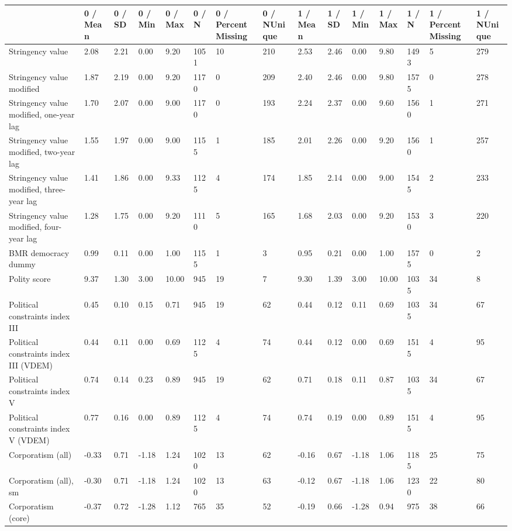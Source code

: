 
\begin{longtable}{lllllllllllllll}
\toprule
  & 0 / Mean & 0 / SD & 0 / Min & 0 / Max & 0 / N & 0 / PercentMissing & 0 / NUnique & 1 / Mean & 1 / SD & 1 / Min & 1 / Max & 1 / N & 1 / PercentMissing & 1 / NUnique\\
\midrule
Stringency value & 2.08 & 2.21 & 0.00 & 9.20 & 1051 & 10 & 210 & 2.53 & 2.46 & 0.00 & 9.80 & 1493 & 5 & 279\\
Stringency value modified & 1.87 & 2.19 & 0.00 & 9.20 & 1170 & 0 & 209 & 2.40 & 2.46 & 0.00 & 9.80 & 1575 & 0 & 278\\
Stringency value modified, one-year lag & 1.70 & 2.07 & 0.00 & 9.00 & 1170 & 0 & 193 & 2.24 & 2.37 & 0.00 & 9.60 & 1560 & 1 & 271\\
Stringency value modified, two-year lag & 1.55 & 1.97 & 0.00 & 9.00 & 1155 & 1 & 185 & 2.01 & 2.26 & 0.00 & 9.20 & 1560 & 1 & 257\\
Stringency value modified, three-year lag & 1.41 & 1.86 & 0.00 & 9.33 & 1125 & 4 & 174 & 1.85 & 2.14 & 0.00 & 9.00 & 1545 & 2 & 233\\
\addlinespace
Stringency value modified, four-year lag & 1.28 & 1.75 & 0.00 & 9.20 & 1110 & 5 & 165 & 1.68 & 2.03 & 0.00 & 9.20 & 1530 & 3 & 220\\
BMR democracy dummy & 0.99 & 0.11 & 0.00 & 1.00 & 1155 & 1 & 3 & 0.95 & 0.21 & 0.00 & 1.00 & 1575 & 0 & 2\\
Polity score & 9.37 & 1.30 & 3.00 & 10.00 & 945 & 19 & 7 & 9.30 & 1.39 & 3.00 & 10.00 & 1035 & 34 & 8\\
Political constraints index III & 0.45 & 0.10 & 0.15 & 0.71 & 945 & 19 & 62 & 0.44 & 0.12 & 0.11 & 0.69 & 1035 & 34 & 67\\
Political constraints index III (VDEM) & 0.44 & 0.11 & 0.00 & 0.69 & 1125 & 4 & 74 & 0.44 & 0.12 & 0.00 & 0.69 & 1515 & 4 & 95\\
\addlinespace
Political constraints index V & 0.74 & 0.14 & 0.23 & 0.89 & 945 & 19 & 62 & 0.71 & 0.18 & 0.11 & 0.87 & 1035 & 34 & 67\\
Political constraints index V (VDEM) & 0.77 & 0.16 & 0.00 & 0.89 & 1125 & 4 & 74 & 0.74 & 0.19 & 0.00 & 0.89 & 1515 & 4 & 95\\
Corporatism (all) & -0.33 & 0.71 & -1.18 & 1.24 & 1020 & 13 & 62 & -0.16 & 0.67 & -1.18 & 1.06 & 1185 & 25 & 75\\
Corporatism (all), sm & -0.30 & 0.71 & -1.18 & 1.24 & 1020 & 13 & 63 & -0.12 & 0.67 & -1.18 & 1.06 & 1230 & 22 & 80\\
Corporatism (core) & -0.37 & 0.72 & -1.28 & 1.12 & 765 & 35 & 52 & -0.19 & 0.66 & -1.28 & 0.94 & 975 & 38 & 66\\

\end{longtable}
